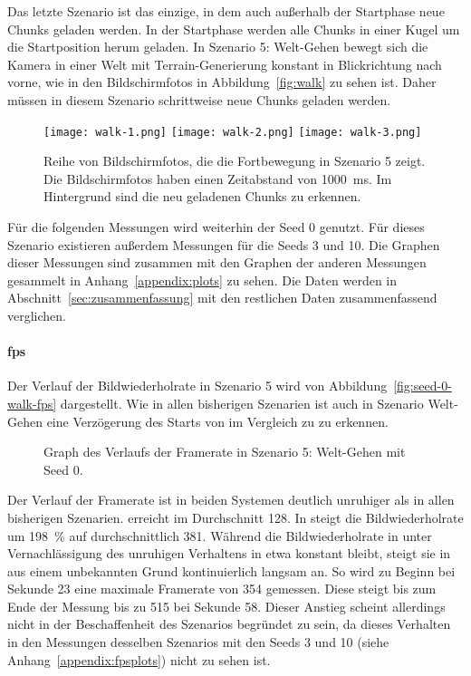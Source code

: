 Das letzte Szenario ist das einzige, in dem auch außerhalb der Startphase neue Chunks geladen werden. In der Startphase werden alle Chunks in einer Kugel um die Startposition herum geladen. In Szenario 5: Welt-Gehen bewegt sich die Kamera in einer Welt mit Terrain-Generierung konstant in Blickrichtung nach vorne, wie in den Bildschirmfotos in Abbildung~\vref{fig:walk} zu sehen ist. Daher müssen in diesem Szenario schrittweise neue Chunks geladen werden.
\begin{figure}[!htbp]
	\centering
	\texttt{[image: walk-1.png]}
	\texttt{[image: walk-2.png]}
	\texttt{[image: walk-3.png]}
	\caption[Reihe von Bildschirmfotos, die die Fortbewegung in Szenario 5 zeigt.]{Reihe von Bildschirmfotos, die die Fortbewegung in Szenario 5 zeigt. Die Bildschirmfotos haben einen Zeitabstand von \SI{1000}{\milli\second}. Im Hintergrund sind die neu geladenen Chunks zu erkennen.}\label{fig:walk}
\end{figure}

Für die folgenden Messungen wird weiterhin der Seed 0 genutzt. Für dieses Szenario existieren außerdem Messungen für die Seeds 3 und 10. Die Graphen dieser Messungen sind zusammen mit den Graphen der anderen Messungen gesammelt in Anhang~\vref{appendix:plots} zu sehen. Die Daten werden in Abschnitt~\ref{sec:zusammenfassung} mit den restlichen Daten zusammenfassend verglichen.

\paragraph{\ac{fps}}
Der Verlauf der Bildwiederholrate in Szenario 5 wird von Abbildung~\vref{fig:seed-0-walk-fps} dargestellt. Wie in allen bisherigen Szenarien ist auch in Szenario Welt-Gehen eine Verzögerung des Starts von \sysB{} im Vergleich zu \sysA{} zu erkennen.
\begin{figure}[!htbp]
	\caption{Graph des Verlaufs der Framerate in Szenario 5: Welt-Gehen mit Seed 0.}\label{fig:seed-0-walk-fps}
\end{figure}
Der Verlauf der Framerate ist in beiden Systemen deutlich unruhiger als in allen bisherigen Szenarien. \sysA{} erreicht im Durchschnitt \SI{128}{\fps}. In \sysB{} steigt die Bildwiederholrate um \SI{198}{\percent} auf durchschnittlich \SI{381}{\fps}. Während die Bildwiederholrate in \sysA{} unter Vernachlässigung des unruhigen Verhaltens in etwa konstant bleibt, steigt sie in \sysB{} aus einem unbekannten Grund kontinuierlich langsam an. So wird zu Beginn bei Sekunde 23 eine maximale Framerate von \SI{354}{\fps} gemessen. Diese steigt bis zum Ende der Messung bis zu \SI{515}{\fps} bei Sekunde 58. Dieser Anstieg scheint allerdings nicht in der Beschaffenheit des Szenarios begründet zu sein, da dieses Verhalten in den Messungen desselben Szenarios mit den Seeds 3 und 10 (siehe Anhang~\vref{appendix:fpsplots}) nicht zu sehen ist. 


